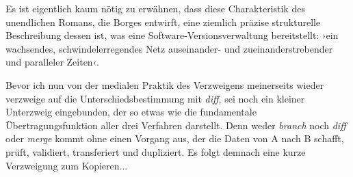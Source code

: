 \documentclass[a4paper,12pt]{article}
\newcommand{\anf}[1]{»#1«}
\newcommand{\inanf}[1]{›#1‹}
\begin{document}
Es ist eigentlich kaum nötig zu erwähnen, dass diese Charakteristik des unendlichen Romans, die Borges entwirft, eine ziemlich präzise strukturelle Beschreibung dessen ist, was eine Software-Versionsverwaltung bereitstellt: \inanf{ein wachsendes, schwindelerregendes Netz auseinander- und zueinanderstrebender und paralleler Zeiten}.

Bevor ich nun von der medialen Praktik des Verzweigens meinerseits wieder verzweige auf die Unterschiedsbestimmung mit \emph{diff}, sei noch ein kleiner Unterzweig eingebunden, der so etwas wie die fundamentale Übertragungsfunktion aller drei Verfahren darstellt. Denn weder \emph{branch} noch \emph{diff} oder \emph{merge} kommt ohne einen Vorgang aus, der die Daten von A nach B schafft, prüft, validiert, transferiert und dupliziert. Es folgt demnach eine kurze Verzweigung zum Kopieren... 


\begin{comment}

 
Für die Coda:
 
Was liegt nun näher als diese abgründige Geschichte über die \anf{Verzweigung in der Zeit}\footcite[169]{borges:1941} als eine Art literarische Präfiguration der informatischen Versionskontrolle einzuordnen. Ja, sicher. 

Borges und die unterschiedlichen Zeitebenen, die in der Fiktion sich anbieten... Dies in Analogie zu unterschiedlichen Entwicklungszeiten bei der Softwareproduktion. 


Alternative Entwürfe sichern

Überblick bewahren. Version und Kontrolle. Diese Eigenschaften sind freilich auch bei der klassischen, das heisst philologischen Edition von Texten erforderlich. \anf{Ich habe Hunderte von Handschriften miteinander verglichen, habe die Fehler korrigiert, die sich durch die Nachlässigkeit der Abschreiber eingeschlichen haben; ich habe den Plan dieses Chaos erschossen, habe die ursprüngliche Ordnung wieder hergestellt}.\footcite[172]{borges:1941}

	***

Joethes Delegationen

Ein weiterer Aspekt
Verzweigen als Delegieren [Dies seinerseits als Abzweigung kennzeichnen...]
Goethes Verzweigungen: Seine lahme Tintenhand.

Sieben: 185–197.

Einbauen: 
"Alle Subalternen nehmen in spezifischer Weise eine Eigenart an, die sie ihrem Herrn und Gebieter ähnlicher werden läßt. Johann Georg Paul Götze, der rund 17 Jahre bei Goethen dient, gelingt es beispielsweise,...Der Meister dupliziert sich in seinen Domestiken."

	***


Siehe auch Schlagwort \inanf{Verzweigung} in Synapsen...

\end{comment}
\end{document}
